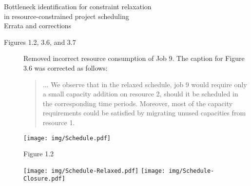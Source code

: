 \documentclass[a4paper]{article}
\begin{document}
{
\LARGE
\begin{center}
    \LARGE{%
        Bottleneck identification for constraint relaxation\\[-0.2em]
        in resource-constrained project scheduling
    }\\[0.5em]
    \large{Errata and corrections}\\[2em]
\end{center}
}

\begin{description}
    \item[Figures 1.2, 3.6, and 3.7]
        Removed incorrect resource consumption of Job 9.
        The caption for Figure 3.6 was corrected as follows:
        \begin{quote}
            ...
            We observe that in the relaxed schedule,
            job 9 would require only a small capacity addition on resource 2,
            should it be scheduled in the corresponding time periods.
            Moreover, most of the capacity requirements could be satisfied
            by migrating unused capacities from resource 1.
        \end{quote}

        \vspace{0.5em}
        \centering\texttt{[image: img/Schedule.pdf]}

        {\centering Figure 1.2\\[1em]}

        \texttt{[image: img/Schedule-Relaxed.pdf]}\hfill%
        \texttt{[image: img/Schedule-Closure.pdf]}

        \noindent{}\hfill{}
        
\end{description}
\end{document}
